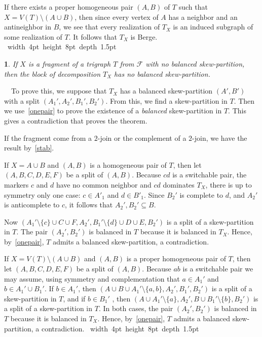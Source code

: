 \documentclass[11 pt] {article}
\newcommand\blackslug{\hbox{\hskip 1pt \vrule width 4pt height 8pt depth 1.5pt
        \hskip 1pt}}
\newcommand\bbox{\hfill \quad \blackslug \medbreak}
\newtheorem{theorem}{}[section]
\newcounter{claim}
\newcommand{\Proof}{\setcounter{claim}{0}\noindent{\bf Proof.}\ \ }
\begin{document}
If there exists a proper homogeneous pair $(A,B)$ of $T$ such that $X
= V(T) \setminus (A\cup B)$, then since every vertex of $A$ has a
neighbor and an antineighbor in $B$, we see that every realization of
$T_X$ is an induced subgraph of some realization of $T$. It follows
that $T_X$ is Berge.  \bbox

\begin{theorem}\label{stabExt}
  If $X$ is a fragment of a trigraph $T$ from $\mathcal{F}$ with no
  balanced skew-partition, then the block of decomposition $T_X$ has
  no balanced skew-partition.
\end{theorem}

\Proof To prove this, we suppose that $T_X$ has a balanced skew-partition $(A',B')$ with a split $(A_1',A_2',B_1',B_2')$.  From this,
we find a skew-partition in $T$.  Then we use~\ref{onepair} to prove
the existence of a \emph{balanced} skew-partition in $T$.  This gives
a contradiction that proves the theorem.

If the fragment come from a $2$-join or the complement of a $2$-join,
we have the result by~\ref{stab}.

If $X = A \cup B$ and $(A, B)$ is a homogeneous
pair of $T$, then  let $(A,B,C,D,E,F)$ be a split of $(A,B)$.
Because $cd$ is a switchable pair, the markers $c$ and $d$ have no
common neighbor and $cd$ dominates $T_X$, there is up to symmetry only
one case: $c\in A'_1$ and $d\in B'_1$. Since $B_2'$ is complete to
$d$, and $A_2'$ is anticomplete to $c$, it follows that $A_2',B_2'
\subseteq B$.

Now $(A_1'\setminus\{c\}\cup C\cup F, A_2', B_1'\setminus\{d\}\cup
D\cup E, B_2')$ is a split of a skew-partition  in
$T$. The pair $(A_2', B_2')$ is balanced in $T$ because it is balanced
in $T_X$.  Hence, by~\ref{onepair}, $T$ admits a balanced skew-partition, a contradiction.

If 
$X=V(T)\setminus (A\cup B)$ and $(A, B)$ is a proper homogeneous pair
of $T$, then  let $(A,B,C,D,E,F)$ be a split of $(A,B)$.  
Because $ab$ is a switchable pair we may assume, using symmetry and
complementation that $a\in A_1'$ and $b\in A_1'\cup B_1'$. If $b\in
A_1'$, then $(A\cup B\cup A_1'\setminus \{a, b\}, A_2' , B_1' , B_2')$
is a split of a skew-partition in $T$, and if $b\in B_1'$ , then
$(A\cup A_1'\setminus \{a\}, A_2' , B\cup B_1'\setminus \{b\}, B_2')$
is a split of a skew-partition in $T$.  In both cases, the pair
$(A_2', B_2')$ is balanced in $T$ because it is balanced in $T_X$.
Hence, by~\ref{onepair}, $T$ admits a balanced skew-partition, a
contradiction. \bbox
\end{document}
